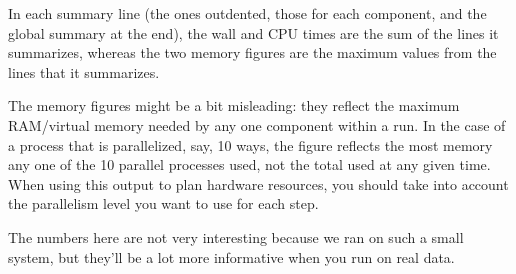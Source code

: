 \documentclass[11pt,letterpaper]{article}
\begin{document}
In each summary line (the ones outdented, those for each component, and the
global summary at the end), the wall and CPU times are the sum of the
lines it summarizes, whereas the two memory figures are the maximum values from
the lines that it summarizes.

The memory figures might be a bit misleading: they reflect the maximum
RAM/virtual memory needed by any one component within a run.  In the case of a
process that is parallelized, say, 10 ways, the figure reflects the most memory
any one of the 10 parallel processes used, not the total used at any given
time.  When using this output to plan hardware resources, you should take into
account the parallelism level you want to use for each step.

The numbers here are not very interesting because we ran on such a small
system, but they'll be a lot more informative when you run on real data.
\end{document}
